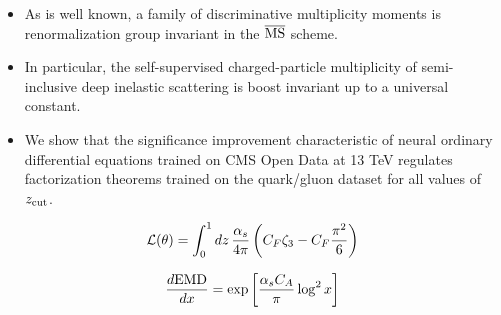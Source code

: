 \begin{itemize}
  \item As is well known, a family of discriminative multiplicity moments is renormalization group invariant in the $\overline{\rm MS}$ scheme.
  \item In particular, the self-supervised charged-particle multiplicity of semi-inclusive deep inelastic scattering is boost invariant up to a universal constant.
  \item We show that the significance improvement characteristic of neural ordinary differential equations trained on CMS Open Data at 13 TeV regulates factorization theorems trained on the quark/gluon dataset for all values of $z_{\rm cut}$.
\end{itemize}

\begin{equation}
  \mathcal{L}(\theta) = \int_0^1 dz \, \frac{\alpha_s}{4\pi} \left( C_F \zeta_{3} - C_F \frac{\pi^2}{6} \right)
  \label{eq:6}
\end{equation}

\begin{equation}
  \frac{d \mathrm{EMD}}{d x} = \exp\left[\frac{\alpha_s C_A}{\pi} \log^2 x\right]
  \label{eq:7}
\end{equation}

